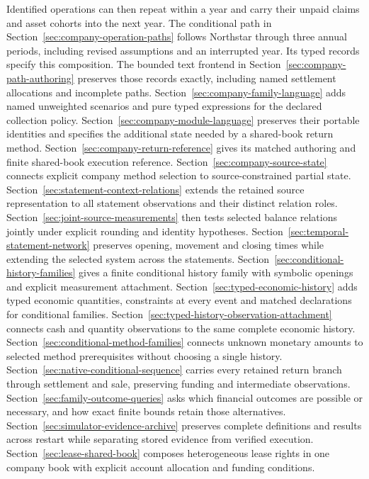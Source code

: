 Identified operations can then repeat within a year and carry their unpaid
claims and asset cohorts into the next year. The conditional path in
Section~\ref{sec:company-operation-paths} follows Northstar through three
annual periods, including revised assumptions and an interrupted year.
Its typed records specify this composition. The bounded text frontend in
Section~\ref{sec:company-path-authoring} preserves those records exactly,
including named settlement allocations and incomplete paths.
Section~\ref{sec:company-family-language} adds named unweighted scenarios and
pure typed expressions for the declared collection policy.
Section~\ref{sec:company-module-language} preserves their portable identities
and specifies the additional state needed by a shared-book return method.
Section~\ref{sec:company-return-reference} gives its matched authoring
and finite shared-book execution reference. Section~\ref{sec:company-source-state}
connects explicit company method selection to source-constrained partial state.
Section~\ref{sec:statement-context-relations} extends the retained source
representation to all statement observations and their distinct relation roles.
Section~\ref{sec:joint-source-measurements} then tests selected balance relations
jointly under explicit rounding and identity hypotheses.
Section~\ref{sec:temporal-statement-network} preserves opening, movement and
closing times while extending the selected system across the statements.
Section~\ref{sec:conditional-history-families} gives a finite conditional
history family with symbolic openings and explicit measurement attachment.
Section~\ref{sec:typed-economic-history} adds typed economic quantities,
constraints at every event and matched declarations for conditional families.
Section~\ref{sec:typed-history-observation-attachment} connects cash and
quantity observations to the same complete economic history.
Section~\ref{sec:conditional-method-families} connects unknown monetary
amounts to selected method prerequisites without choosing a single history.
Section~\ref{sec:native-conditional-sequence} carries every retained return
branch through settlement and sale, preserving funding and intermediate observations.
Section~\ref{sec:family-outcome-queries} asks which financial outcomes are possible
or necessary, and how exact finite bounds retain those alternatives.
Section~\ref{sec:simulator-evidence-archive} preserves complete definitions and
results across restart while separating stored evidence from verified execution.
Section~\ref{sec:lease-shared-book} composes heterogeneous lease rights in
one company book with explicit account allocation and funding conditions.
